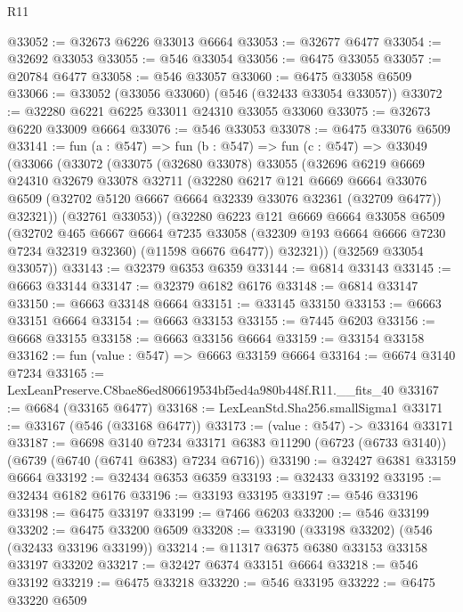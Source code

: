 \begin{lexlean}{R11}
\begin{coremodule}
@33052 := @32673 @6226 @33013 @6664
@33053 := @32677 @6477
@33054 := @32692 @33053
@33055 := @546 @33054
@33056 := @6475 @33055
@33057 := @20784 @6477
@33058 := @546 @33057
@33060 := @6475 @33058 @6509
@33066 := @33052 (@33056 @33060) (@546 (@32433 @33054 @33057))
@33072 := @32280 @6221 @6225 @33011 @24310 @33055 @33060
@33075 := @32673 @6220 @33009 @6664
@33076 := @546 @33053
@33078 := @6475 @33076 @6509
@33141 := fun (a : @547) =>
  fun (b : @547) =>
  fun (c : @547) =>
  @33049
    (@33066
      (@33072
        (@33075
          (@32680 @33078)
          @33055
          (@32696
            @6219
            @6669
            @24310
            @32679
            @33078
            @32711
            (@32280
              @6217
              @121
              @6669
              @6664
              @33076
              @6509
              (@32702 @5120 @6667 @6664 @32339 @33076 @32361 (@32709 @6477))
              @32321))
          (@32761 @33053))
        (@32280
          @6223
          @121
          @6669
          @6664
          @33058
          @6509
          (@32702
            @465
            @6667
            @6664
            @7235
            @33058
            (@32309 @193 @6664 @6666 @7230 @7234 @32319 @32360)
            (@11598 @6676 @6477))
          @32321))
      (@32569 @33054 @33057))
@33143 := @32379 @6353 @6359
@33144 := @6814 @33143
@33145 := @6663 @33144
@33147 := @32379 @6182 @6176
@33148 := @6814 @33147
@33150 := @6663 @33148 @6664
@33151 := @33145 @33150
@33153 := @6663 @33151 @6664
@33154 := @6663 @33153
@33155 := @7445 @6203
@33156 := @6668 @33155
@33158 := @6663 @33156 @6664
@33159 := @33154 @33158
@33162 := fun (value : @547) => @6663 @33159 @6664
@33164 := @6674 @3140 @7234
@33165 := LexLeanPreserve.C8bae86ed806619534bf5ed4a980b448f.R11.__fits_40
@33167 := @6684 (@33165 @6477)
@33168 := LexLeanStd.Sha256.smallSigma1
@33171 := @33167 (@546 (@33168 @6477))
@33173 := (value : @547) -> @33164 @33171
@33187 := @6698
    @3140
    @7234
    @33171
    @6383
    @11290
    (@6723 (@6733 @3140))
    (@6739 (@6740 (@6741 @6383) @7234 @6716))
@33190 := @32427 @6381 @33159 @6664
@33192 := @32434 @6353 @6359
@33193 := @32433 @33192
@33195 := @32434 @6182 @6176
@33196 := @33193 @33195
@33197 := @546 @33196
@33198 := @6475 @33197
@33199 := @7466 @6203
@33200 := @546 @33199
@33202 := @6475 @33200 @6509
@33208 := @33190 (@33198 @33202) (@546 (@32433 @33196 @33199))
@33214 := @11317 @6375 @6380 @33153 @33158 @33197 @33202
@33217 := @32427 @6374 @33151 @6664
@33218 := @546 @33192
@33219 := @6475 @33218
@33220 := @546 @33195
@33222 := @6475 @33220 @6509

\end{coremodule}
\end{lexlean}
